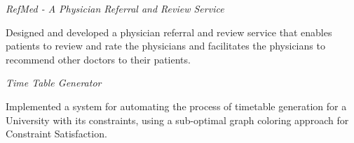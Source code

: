 \documentclass[10pt]{article}
\newcommand{\spc}{\vspace{1mm}}
\begin{document}
\textit{RefMed - A Physician Referral and Review Service}
\begin{compactitem}
\item {Designed and developed a physician referral and review service that enables patients to review and rate the physicians and facilitates the physicians to recommend other doctors to their patients.}
\end{compactitem}
\textit{Time Table Generator}
\begin{compactitem}
\item Implemented a system for automating the process of timetable generation for a University with its constraints, using a sub-optimal graph coloring approach for Constraint Satisfaction.
\end{compactitem}
\spc
\end{document}

